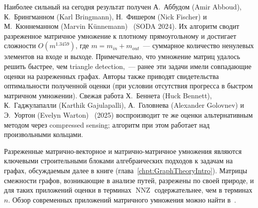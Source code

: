 Наиболее сильный на сегодня результат получен А.~Аббудом (Amir Abboud), К.~Брингманном (Karl Bringmann), Н.~Фишером (Nick Fischer) и М.~Кюннеманном (Marvin Künnemann)~ (SODA 2024).
Их алгоритм сводит разреженное матричное умножение к плотному прямоугольному и достигает сложности $O(m^{1.3459})$, где $m = m_{in} + m_{out}$~--- суммарное количество ненулевых элементов на входе и выходе.
Примечательно, что умножение матриц удалось решить быстрее, чем triangle detection,~--- ранее эти задачи имели совпадающие оценки на разреженных графах.
Авторы также приводят свидетельства оптимальности полученной оценки (при условии отсутствия прогресса в быстром матричном умножении).
Свежая работа Х.~Беннета (Huck Bennett), К.~Гаджулапалли (Karthik Gajulapalli), А.~Головнева (Alexander Golovnev) и Э.~Уортон (Evelyn Warton)~ (2025) воспроизводит те же оценки альтернативным методом через compressed sensing; алгоритм при этом работает над произвольными кольцами.

Разреженные матрично-векторное и матрично-матричное умножения являются ключевыми строительными блоками алгебраических подходов к задачам на графах, обсуждаемым далее в книге (глава~\ref{chpt:GraphTheoryIntro}).
Матрицы смежности графов, возникающие в анализе путей, разрежены по своей природе, и для таких приложений оценки в терминах $\operatorname{NNZ}$ содержательнее, чем в терминах $n$.
Обзор современных приложений матричного умножения можно найти в~.

